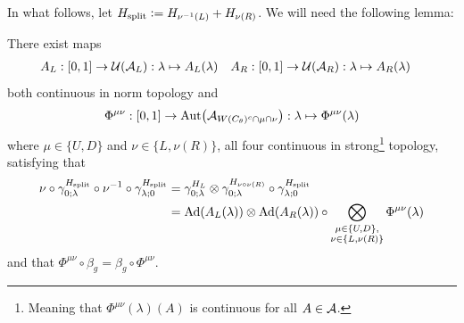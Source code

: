 \documentclass[12pt,a4paper,twoside]{article}
\numberwithin{equation}{section}
\begin{document}
In what follows, let $H_{\text{split}}\defeq H_{\nu^{-1}(L)}+H_{\nu(R)}$. We will need the following lemma:
\begin{lemma}\label{lem:SplittedAutomorphismAfterTranslatedIsVertical}
	There exist maps
	\begin{align}
		A_L&:[0,1]\rightarrow \UU(\AA_L):\lambda\mapsto A_{L}(\lambda)&A_R&:[0,1]\rightarrow \UU(\AA_R):\lambda\mapsto A_{R}(\lambda)
	\end{align}
	both continuous in norm topology and
	\begin{align}
		\Phi^{\mu\nu}:[0,1]\rightarrow\Aut{\AA_{W(C_\theta)^c\cap\mu\cap\nu}}:\lambda\mapsto \Phi^{\mu\nu}(\lambda)
	\end{align}
	where $\mu\in\{U,D\}$ and $\nu\in\{L,\nu(R)\}$, all four continuous in  strong\footnote{Meaning that $\Phi^{\mu\nu}(\lambda)(A)$ is continuous for all $A\in\AA$.} topology, satisfying that
	\begin{align}
		\nu\circ\gamma^{H_{\text{split}}}_{0;\lambda}\circ\nu^{-1}\circ\gamma^{H_{\text{split}}}_{\lambda;0}&=\gamma^{H_L}_{0;\lambda}\otimes\gamma^{H_{\nu\circ\nu(R)}}_{0;\lambda}\circ\gamma^{H_{\text{split}}}_{\lambda;0}\\
		\label{eq:TranslatingSplittedTimeEvolutionAppendix}
		&=\Ad{A_L(\lambda)}\otimes\Ad{A_R(\lambda)}\circ\bigotimes_{\substack{\mu\in\{U,D\},\\\nu\in\{L,\nu(R)\}}}\Phi^{\mu\nu}(\lambda)
	\end{align}
	and that $\Phi^{\mu\nu}\circ\beta_g=\beta_g\circ\Phi^{\mu\nu}$.
\end{lemma}
\end{document}
